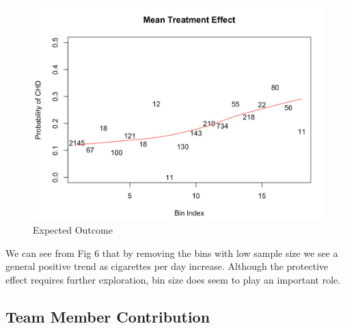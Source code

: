 \documentclass[]{article}
\begin{document}
\begin{figure}[H]

{\centering \includegraphics[width=0.5\linewidth]{./pos_violation2} 

}

\caption{Expected Outcome}\label{fig:fig6}
\end{figure}

We can see from Fig 6 that by removing the bins with low sample size we
see a general positive trend as cigarettes per day increase. Although
the protective effect requires further exploration, bin size does seem
to play an important role.

\newpage

\subsection{Team Member Contribution}\label{team-member-contribution}
\end{document}
